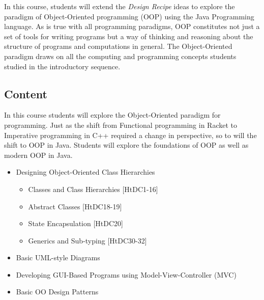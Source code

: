 \documentclass[10pt]{article}
\begin{document}
In this course, students will extend the \textit{Design Recipe} ideas to explore the paradigm of Object-Oriented programming (OOP) using the Java Programming language.  As is true with all programming paradigms, OOP constitutes not just a set of tools for writing programs but a way of thinking and reasoning about the structure of programs and computations in general.   The Object-Oriented paradigm draws on all the computing and programming concepts students studied in the introductory sequence.

\subsection{Content}

In this course students will explore the Object-Oriented paradigm for programming. Just as the shift from Functional programming in Racket to Imperative programming in C++ required a change in perspective, so to will the shift to OOP in Java.  Students will explore the foundations of OOP as well as modern OOP in Java. 

\begin{itemize}
\item Designing Object-Oriented Class Hierarchies
\begin{itemize}
\item Classes and Class Hierarchies [HtDC1-16]
\item Abstract Classes [HtDC18-19]
\item State Encapsulation [HtDC20]
\item Generics and Sub-typing [HtDC30-32]
\end{itemize}
\item Basic UML-style Diagrams
\item Developing GUI-Based Programs using Model-View-Controller (MVC)
\item Basic OO Design Patterns
\end{itemize}
\end{document}
